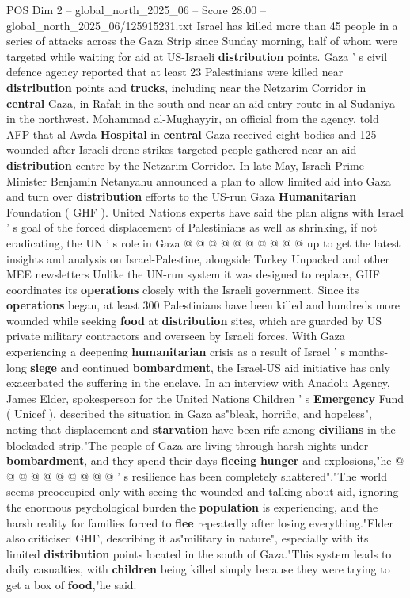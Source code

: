 \begin{textsample}{POS Dim 2 – global\_north\_2025\_06 – Score 28.00 – global\_north\_2025\_06/125915231.txt}  \label{ex:f2_pos_226}
Israel has killed more than 45 people in a series of attacks across the Gaza Strip since Sunday morning, half of whom were targeted while waiting for aid at US-Israeli \textbf{distribution} points.
Gaza ' s civil defence agency reported that at least 23 Palestinians were killed near \textbf{distribution} points and \textbf{trucks}, including near the Netzarim Corridor in \textbf{central} Gaza, in Rafah in the south and near an aid entry route in al-Sudaniya in the northwest.
Mohammad al-Mughayyir, an official from the agency, told AFP that al-Awda \textbf{Hospital} in \textbf{central} Gaza received eight bodies and 125 wounded after Israeli drone strikes targeted people gathered near an aid \textbf{distribution} centre by the Netzarim Corridor.
In late May, Israeli Prime Minister Benjamin Netanyahu announced a plan to allow limited aid into Gaza and turn over \textbf{distribution} efforts to the US-run Gaza \textbf{Humanitarian} Foundation ( GHF ).
United Nations experts have said the plan aligns with Israel ' s goal of the forced displacement of Palestinians as well as shrinking, if not eradicating, the UN ' s role in Gaza @ @ @ @ @ @ @ @ @ @ up to get the latest insights and analysis on Israel-Palestine, alongside Turkey Unpacked and other MEE newsletters Unlike the UN-run system it was designed to replace, GHF coordinates its \textbf{operations} closely with the Israeli government.
Since its \textbf{operations} began, at least 300 Palestinians have been killed and hundreds more wounded while seeking \textbf{food} at \textbf{distribution} sites, which are guarded by US private military contractors and overseen by Israeli forces.
With Gaza experiencing a deepening \textbf{humanitarian} crisis as a result of Israel ' s months-long \textbf{siege} and continued \textbf{bombardment}, the Israel-US aid initiative has only exacerbated the suffering in the enclave.
In an interview with Anadolu Agency, James Elder, spokesperson for the United Nations Children ' s \textbf{Emergency} Fund ( Unicef ), described the situation in Gaza as"bleak, horrific, and hopeless", noting that displacement and \textbf{starvation} have been rife among \textbf{civilians} in the blockaded strip."The people of Gaza are living through harsh nights under \textbf{bombardment}, and they spend their days \textbf{fleeing} \textbf{hunger} and explosions,"he @ @ @ @ @ @ @ @ @ @ ' s resilience has been completely shattered"."The world seems preoccupied only with seeing the wounded and talking about aid, ignoring the enormous psychological burden the \textbf{population} is experiencing, and the harsh reality for families forced to \textbf{flee} repeatedly after losing everything."Elder also criticised GHF, describing it as"military in nature", especially with its limited \textbf{distribution} points located in the south of Gaza."This system leads to daily casualties, with \textbf{children} being killed simply because they were trying to get a box of \textbf{food},"he said.

\end{textsample}
